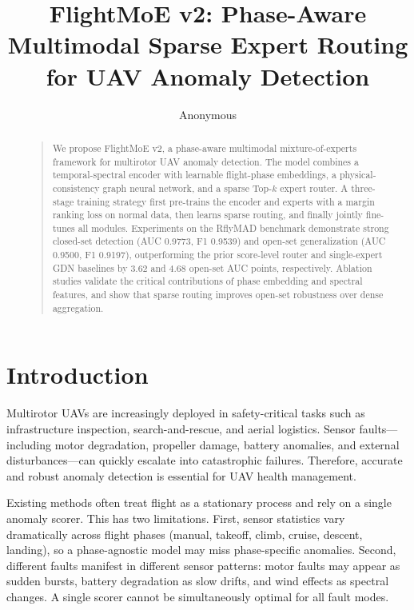 \documentclass[letterpaper]{article}
\begin{document}
\title{FlightMoE v2: Phase-Aware Multimodal Sparse Expert Routing for UAV Anomaly Detection}
\author{Anonymous}
\maketitle

\begin{abstract}
\begin{quote}
We propose FlightMoE v2, a phase-aware multimodal mixture-of-experts framework for multirotor UAV anomaly detection. The model combines a temporal-spectral encoder with learnable flight-phase embeddings, a physical-consistency graph neural network, and a sparse Top-\(k\) expert router. A three-stage training strategy first pre-trains the encoder and experts with a margin ranking loss on normal data, then learns sparse routing, and finally jointly fine-tunes all modules. Experiments on the RflyMAD benchmark demonstrate strong closed-set detection (AUC 0.9773, F1 0.9539) and open-set generalization (AUC 0.9500, F1 0.9197), outperforming the prior score-level router and single-expert GDN baselines by 3.62 and 4.68 open-set AUC points, respectively. Ablation studies validate the critical contributions of phase embedding and spectral features, and show that sparse routing improves open-set robustness over dense aggregation.
\end{quote}
\end{abstract}

\section{Introduction}
Multirotor UAVs are increasingly deployed in safety-critical tasks such as infrastructure inspection, search-and-rescue, and aerial logistics. Sensor faults---including motor degradation, propeller damage, battery anomalies, and external disturbances---can quickly escalate into catastrophic failures. Therefore, accurate and robust anomaly detection is essential for UAV health management.

Existing methods often treat flight as a stationary process and rely on a single anomaly scorer. This has two limitations. First, sensor statistics vary dramatically across flight phases (manual, takeoff, climb, cruise, descent, landing), so a phase-agnostic model may miss phase-specific anomalies. Second, different faults manifest in different sensor patterns: motor faults may appear as sudden bursts, battery degradation as slow drifts, and wind effects as spectral changes. A single scorer cannot be simultaneously optimal for all fault modes.
\end{document}
